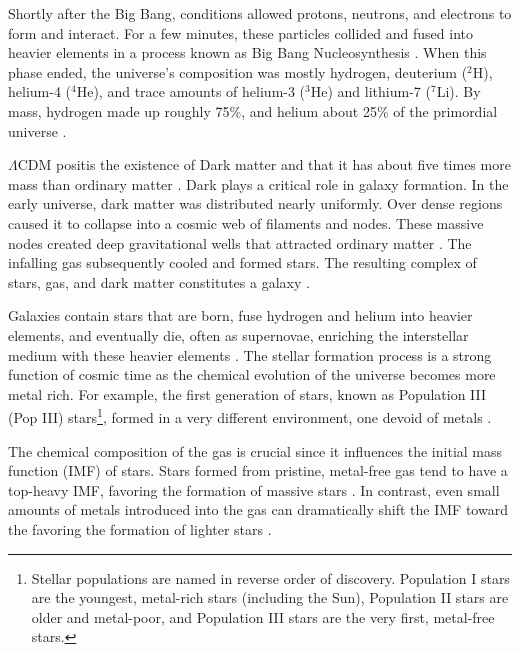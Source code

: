    Shortly after the Big Bang, conditions allowed protons, neutrons, and electrons to form and interact. For a few minutes, these particles collided and fused into heavier elements in a process known as Big Bang Nucleosynthesis \citep{2007ARNPS..57..463S}. When this phase ended, the universe's composition was mostly hydrogen, deuterium ($^2$H), helium-4 ($^4$He), and trace amounts of helium-3 ($^3$He) and lithium-7 ($^7$Li). By mass, hydrogen made up roughly 75\%, and helium about 25\% of the primordial universe \citep{1966ApJ...146..542P,2016RvMP...88a5004C}.

    $\Lambda$CDM positis the existence of Dark matter and that it has about five times more mass than ordinary matter \citep{2020A&A...641A...6P}. Dark plays a critical role in galaxy formation. In the early universe, dark matter was distributed nearly uniformly. Over dense regions caused it to collapse into a cosmic web of filaments and nodes. These massive nodes created deep gravitational wells that attracted ordinary matter \citep{1974ApJ...187..425P}. The infalling gas subsequently cooled and formed stars. The resulting complex of stars, gas, and dark matter constitutes a galaxy \citep{2008LNP...740.....P,2010gfe..book.....M}.

    Galaxies contain stars that are born, fuse hydrogen and helium into heavier elements, and eventually die, often as supernovae, enriching the interstellar medium with these heavier elements \citep{2019A&ARv..27....3M}. The stellar formation process is a strong function of cosmic time as the chemical evolution of the universe becomes more metal rich. For example, the first generation of stars, known as Population III (Pop III) stars\footnote{Stellar populations are named in reverse order of discovery. Population I stars are the youngest, metal-rich stars (including the Sun), Population II stars are older and metal-poor, and Population III stars are the very first, metal-free stars.}, formed in a very different environment, one devoid of metals \citep{2002Sci...295...93A,2005SSRv..117..445G,2013RPPh...76k2901B}. 

    The chemical composition of the gas is crucial since it influences the initial mass function (IMF) of stars. Stars formed from pristine, metal-free gas tend to have a top-heavy IMF, favoring the formation of massive stars \citep{2002ApJ...571...30S,2006MNRAS.369..825S}. In contrast, even small amounts of metals introduced into the gas can dramatically shift the IMF toward the favoring the formation of lighter stars \citep{2021MNRAS.508.4175C}.

